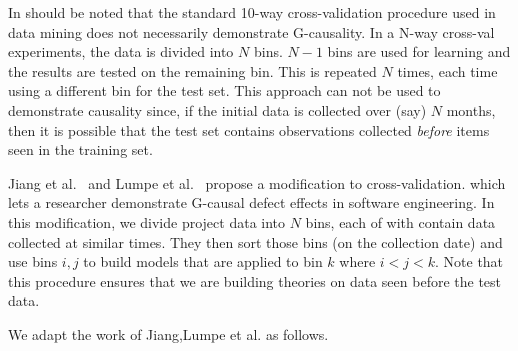 In should be noted  that the standard 10-way cross-validation
procedure used  in data mining does not necessarily demonstrate G-causality.  In a N-way cross-val experiments, the data is divided into $N$ bins.  
$N-1$ bins are used for learning and the results are tested
on the  remaining bin.
This is repeated $N$ times, each time using a different bin for the test set.
This approach can not be used to demonstrate causality since, if the initial data is collected
over (say) $N$ months, then it is possible that the test set contains observations collected
{\em before}   items seen in the training set. 

Jiang et al.~\cite{me11f} and Lumpe et al.~\cite{me11f} propose a modification to cross-validation.
which lets a researcher
demonstrate G-causal defect effects in software engineering.
In this modification, we  divide project data  into $N$ bins, each of with contain data collected at similar times.
They then sort those bins (on the collection date) and use bins $i,j$ to build models that
are applied to bin  $k$ where 
$i<j<k$. Note that this procedure ensures that we are building theories on data seen
before the test data.

We adapt the work of Jiang,Lumpe et al.  as follows.